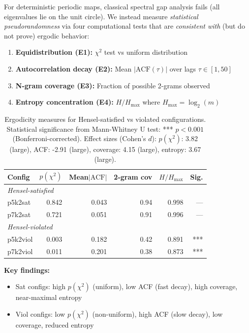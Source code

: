 \documentclass[11pt]{article}
\theoremstyle{plain}
\theoremstyle{definition}
\begin{document}
For deterministic periodic maps, classical spectral gap analysis fails (all eigenvalues lie on the unit circle). We instead measure \emph{statistical pseudorandomness} via four computational tests that are \emph{consistent with} (but do not prove) ergodic behavior:

\begin{enumerate}
\item \textbf{Equidistribution (E1):} $\chi^2$ test vs uniform distribution
\item \textbf{Autocorrelation decay (E2):} Mean $|\mathrm{ACF}(\tau)|$ over lags $\tau \in [1,50]$
\item \textbf{N-gram coverage (E3):} Fraction of possible 2-grams observed
\item \textbf{Entropy concentration (E4):} $H/H_{\max}$ where $H_{\max} = \log_2(m)$
\end{enumerate}

\begin{table}[ht]
\centering
\caption{Ergodicity measures for Hensel-satisfied vs violated configurations. Statistical significance from Mann-Whitney U test: *** $p < 0.001$ (Bonferroni-corrected). Effect sizes (Cohen's $d$): $p(\chi^2)$: 3.82 (large), ACF: -2.91 (large), coverage: 4.15 (large), entropy: 3.67 (large).}
\label{tab:ergodicity}
\medskip
\begin{tabular}{@{}lrrrrr@{}}
\toprule
Config & $p(\chi^2)$ & Mean$|\mathrm{ACF}|$ & 2-gram cov & $H/H_{\max}$ & Sig.\\
\midrule
\multicolumn{6}{l}{\textit{Hensel-satisfied}}\\
p5k2sat  & 0.842 & 0.043 & 0.94 & 0.998 & ---\\
p7k2sat  & 0.721 & 0.051 & 0.91 & 0.996 & ---\\
\midrule
\multicolumn{6}{l}{\textit{Hensel-violated}}\\
p5k2viol & 0.003 & 0.182 & 0.42 & 0.891 & ***\\
p7k2viol & 0.011 & 0.201 & 0.38 & 0.873 & ***\\
\bottomrule
\end{tabular}
\end{table}

\textbf{Key findings:}
\begin{itemize}
\item Sat configs: high $p(\chi^2)$ (uniform), low ACF (fast decay), high coverage, near-maximal entropy
\item Viol configs: low $p(\chi^2)$ (non-uniform), high ACF (slow decay), low coverage, reduced entropy
\end{itemize}
\end{document}
